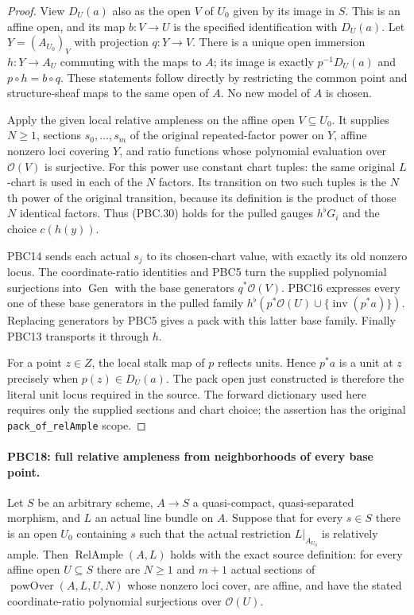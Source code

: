 \documentclass[11pt,a4paper]{article}
\numberwithin{equation}{section}
\theoremstyle{remark}\newtheorem{remark}[theorem]{Remark}
\begin{document}
\begin{proof}
View $D_U(a)$ also as the open $V$ of $U_0$ given by its image
in $S$.  This is an affine open, and its map $b:V\to U$
is the specified identification with $D_U(a)$.
Let $Y=(A_{U_0})_V$ with projection $q:Y\to V$.
There is a unique open immersion $h:Y\to A_U$ commuting with
the maps to $A$; its image is exactly $p^{-1}D_U(a)$ and
$p\circ h=b\circ q$.  These statements follow directly by
restricting the common point and structure-sheaf maps to the
same open of $A$.  No new model of $A$ is chosen.

Apply the given local relative ampleness on the affine open
$V\subseteq U_0$.  It supplies $N\ge1$, sections
$s_0,\ldots,s_m$ of the original repeated-factor power on
$Y$, affine nonzero loci covering $Y$, and ratio functions
whose polynomial evaluation over $\mathcal O(V)$ is surjective.
For this power use constant chart tuples: the same original
$L$-chart is used in each of the $N$ factors.
Its transition on two such tuples is the $N$th power of
the original transition, because its definition is the product
of those $N$ identical factors.  Thus (PBC.30) holds for the
pulled gauges $h^\flat G_i$ and the choice $c(h(y))$.

PBC14 sends each actual $s_j$ to its chosen-chart value,
with exactly its old nonzero locus.  The coordinate-ratio
identities and PBC5 turn the supplied polynomial surjections
into $\operatorname{Gen}$ with the base generators
$q^*\mathcal O(V)$.
PBC16 expresses every one of these base generators in the
pulled family
$h^\flat(p^*\mathcal O(U)\cup\{\operatorname{inv}(p^*a)\})$.
Replacing generators by PBC5 gives a pack with this latter
base family.  Finally PBC13 transports it through $h$.

For a point $z\in Z$, the local stalk map of $p$ reflects
units.  Hence $p^*a$ is a unit at $z$ precisely when
$p(z)\in D_U(a)$.  The pack open just constructed is
therefore the literal unit locus required in the source.
The forward dictionary used here requires only the supplied
sections and chart choice; the assertion has the original
\texttt{pack\_\allowbreak of\_\allowbreak rel\allowbreak Ample} scope.
\end{proof}

\paragraph{PBC18: full relative ampleness from neighborhoods of every base point.}
\label{claim:PBC18}
Let $S$ be an arbitrary scheme, $A\to S$ a quasi-compact,
quasi-separated morphism, and $L$ an actual line bundle on
$A$.  Suppose that for every $s\in S$ there is an open
$U_0$ containing $s$ such that the actual restriction
$L|_{A_{U_0}}$ is relatively ample.  Then
$\operatorname{RelAmple}(A,L)$ holds with the exact source
definition: for every affine open $U\subseteq S$ there are
$N\ge1$ and $m+1$ actual sections of
$\operatorname{powOver}(A,L,U,N)$ whose nonzero loci cover,
are affine, and have the stated coordinate-ratio polynomial
surjections over $\mathcal O(U)$.
\end{document}
